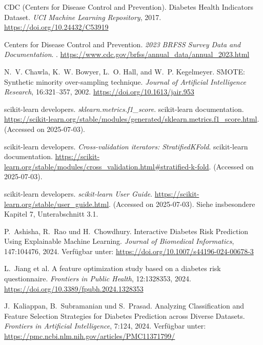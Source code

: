 \documentclass[10pt]{scrartcl}
\begin{document}
\begin{thebibliography}{}
CDC (Centers for Disease Control and Prevention).  
\newblock Diabetes Health Indicators Dataset.  
\newblock \emph{UCI Machine Learning Repository}, 2017.  
\newblock \url{https://doi.org/10.24432/C53919}

Centers for Disease Control and Prevention.
\newblock \emph{2023 BRFSS Survey Data and Documentation}.
. \url{https://www.cdc.gov/brfss/annual_data/annual_2023.html}


N.~V. Chawla, K.~W. Bowyer, L.~O. Hall, and W.~P. Kegelmeyer.
\newblock SMOTE: Synthetic minority over-sampling technique.
\newblock \emph{Journal of Artificial Intelligence Research}, 16:321--357, 2002.
\newblock \url{https://doi.org/10.1613/jair.953}

  {{scikit-learn developers}}.
  \newblock \emph{sklearn.metrics.f1\_score}.
  \newblock scikit-learn documentation.
  \newblock \url{https://scikit-learn.org/stable/modules/generated/sklearn.metrics.f1_score.html}.
  \newblock (Accessed on 2025-07-03).

  {{scikit-learn developers}}.
  \newblock \emph{Cross-validation iterators: StratifiedKFold}.
  \newblock scikit-learn documentation.
  \newblock \url{https://scikit-learn.org/stable/modules/cross_validation.html#stratified-k-fold}.
  \newblock (Accessed on 2025-07-03).

  {{scikit-learn developers}}.
  \newblock \emph{scikit-learn User Guide}.
  \newblock \url{https://scikit-learn.org/stable/user_guide.html}.
  \newblock (Accessed on 2025-07-03).
  \newblock Siehe insbesondere Kapitel 7, Unterabschnitt 3.1.

P.~Ashisha, R.~Rao und H.~Chowdhury.
\newblock Interactive Diabetes Risk Prediction Using Explainable Machine
          Learning.
\newblock \emph{Journal of Biomedical Informatics}, 147:104476, 2024.
\newblock Verfügbar unter:
\url{https://doi.org/10.1007/s44196-024-00678-3}

L.~Jiang et al.  
\newblock A feature optimization study based on a diabetes risk questionnaire.  
\newblock \emph{Frontiers in Public Health}, 12:1328353, 2024.  
\newblock \url{https://doi.org/10.3389/fpubh.2024.1328353}

J.~Kaliappan, B.~Subramanian und S.~Prasad.
\newblock Analyzing Classification and Feature Selection Strategies for Diabetes
          Prediction across Diverse Datasets.
\newblock \emph{Frontiers in Artificial Intelligence}, 7:124, 2024.
\newblock Verfügbar unter:
\url{https://pmc.ncbi.nlm.nih.gov/articles/PMC11371799/}


\end{thebibliography}
\end{document}
